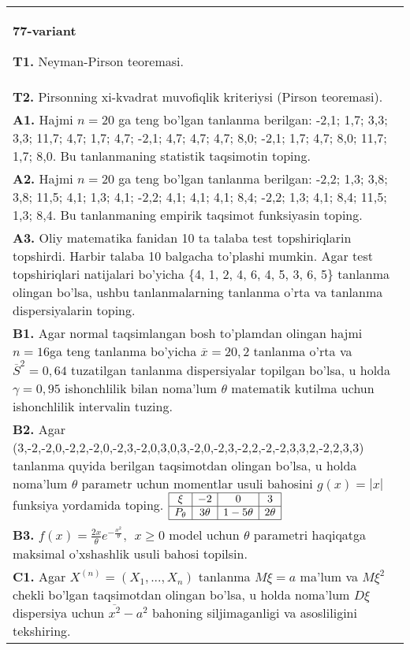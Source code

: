 \documentclass{article}
\begin{document}
\begin{tabular}{m{17cm}}
\textbf{77-variant}
\newline

\textbf{T1.} 
Neyman-Pirson teoremasi.
\\
\textbf{T2.} 
Pirsonning xi-kvadrat muvofiqlik kriteriysi (Pirson teoremasi).
\\
\textbf{A1.} 
Hajmi \(n = 20\) ga teng bo'lgan tanlanma berilgan: -2,1; 1,7; 3,3; 3,3; 11,7; 4,7; 1,7; 4,7; -2,1; 4,7; 4,7; 4,7; 8,0; -2,1; 1,7; 4,7; 8,0; 11,7; 1,7; 8,0. Bu tanlanmaning statistik taqsimotin toping.
\\
\textbf{A2.} 
Hajmi \(n = 20\) ga teng bo'lgan tanlanma berilgan: -2,2; 1,3; 3,8; 3,8; 11,5; 4,1; 1,3; 4,1; -2,2; 4,1; 4,1; 4,1; 8,4; -2,2; 1,3; 4,1; 8,4; 11,5; 1,3; 8,4. Bu tanlanmaning empirik taqsimot funksiyasin toping.
\\
\textbf{A3.} 
Oliy matematika fanidan 10 ta talaba test topshiriqlarin topshirdi. Harbir talaba 10 balgacha to'plashi mumkin. Agar test topshiriqlari natijalari bo'yicha \{4, 1, 2, 4, 6, 4, 5, 3, 6, 5\} tanlanma olingan bo'lsa, ushbu tanlanmalarning tanlanma o'rta va tanlanma dispersiyalarin toping.
\\
\textbf{B1.} 
Agar normal taqsimlangan bosh to'plamdan olingan hajmi \(n = 16\)ga teng tanlanma bo'yicha \(\overline{x} = 20,2\) tanlanma o'rta va \({\overline{S}}^{2} = 0,64\) tuzatilgan tanlanma dispersiyalar topilgan bo'lsa, u holda \(\gamma = 0,95\) ishonchlilik bilan noma'lum \(\theta\) matematik kutilma uchun ishonchlilik intervalin tuzing.
\\
\textbf{B2.} 
Agar (3,-2,-2,0,-2,2,-2,0,-2,3,-2,0,3,0,3,-2,0,-2,3,-2,2,-2,-2,3,3,2,-2,2,3,3) tanlanma quyida berilgan taqsimotdan olingan bo'lsa, u holda noma'lum \(\theta\) parametr uchun momentlar usuli bahosini \(g(x) = |x|\) funksiya yordamida toping.
$\begin{array}{|c|c|c|c|}
    \hline
    \xi & -2 & 0 & 3 \\
    \hline
    P_{\theta} & 3\theta & 1 - 5\theta & 2\theta \\
    \hline
\end{array}$
\\
\textbf{B3.} 
\(f(x) = \frac{2x}{\theta}e^{- \frac{x^{2}}{\theta}},\ \ x \geq 0\) model uchun \(\theta\) parametri haqiqatga maksimal o'xshashlik usuli bahosi topilsin.
\\
\textbf{C1.} 
Agar \(X^{(n)} = \left( X_{1},...,X_{n} \right)\) tanlanma \(M\xi = a\) ma'lum va \(M\xi^{2}\) chekli bo'lgan taqsimotdan olingan bo'lsa, u holda noma'lum \(D\xi\) dispersiya uchun \(\overline{x^{2}} - a^{2}\) bahoning siljimaganligi va asosliligini tekshiring.

\end{tabular}
\end{document}
